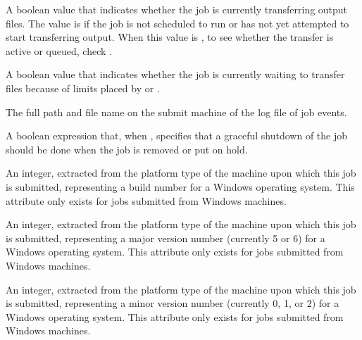 \begin{description}
\item[\AdAttr{TransferringOutput}:]
A boolean value that indicates whether the job is currently
transferring output files.  The value is  if the job
is not scheduled to run or has not yet attempted to start transferring
output.  When this value is , to see whether the transfer
is active or queued, check .

\item[\AdAttr{TransferQueued}:]

A boolean value that indicates whether the job is currently waiting to
transfer files because of limits placed by
 or
.

\item[\AdAttr{UserLog}:] The full path and file name on the submit machine
of the log file of job events.   

\item[\AdAttr{WantGracefulRemoval}:] A boolean expression that,
when , specifies that a graceful shutdown of the job
should be done when the job is removed or put on hold.

\item[\AdAttr{WindowsBuildNumber}:] An integer, extracted from the
platform type of the machine upon which this job is submitted,
representing a build number for a Windows operating system.
This attribute only exists for jobs submitted from Windows machines.

\item[\AdAttr{WindowsMajorVersion}:] An integer, extracted from the
platform type of the machine upon which this job is submitted,
representing a major version number (currently 5 or 6)
for a Windows operating system.
This attribute only exists for jobs submitted from Windows machines.

\item[\AdAttr{WindowsMinorVersion}:] An integer, extracted from the
platform type of the machine upon which this job is submitted, 
representing a minor version number (currently 0, 1, or 2)
for a Windows operating system.
This attribute only exists for jobs submitted from Windows machines.


\end{description}
